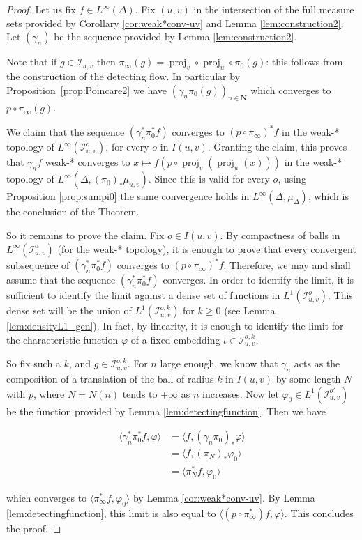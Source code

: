 \documentclass[a4paper, 11pt]{article}
\theoremstyle{plain}
\theoremstyle{definition}
\theoremstyle{remark}
\DeclareMathOperator{\proj}{proj}
\newcommand{\NN}{\mathbf{N}}                          %
\newcommand{\IR}{\mathcal I}
\begin{document}
\begin{proof}
Let us fix $f\in L^\infty(\Delta)$. 
Fix $(u,v)$ in the intersection of the full measure sets provided by Corollary \ref{cor:weak*conv-uv} and Lemma \ref{lem:construction2}. Let $(\gamma_n)$ be the sequence provided by Lemma \ref{lem:construction2}. 

Note that if $g\in \IR_{u,v}$ then $\pi_\infty( g )= \proj_v \circ \proj_u \circ \pi_0 (g)$: this follows from the construction of the detecting flow. In particular by Proposition~\ref{prop:Poincare2} we have $(\gamma_n \pi_0(g))_{n\in \NN}$ which converges to $p\circ \pi_\infty(g)$.

We claim that the sequence $(\gamma_n^* \pi_0^* f)$ converges to $(p\circ \pi_\infty)^* f$ in the weak-* topology of $L^\infty (\IR_{u,v}^o)$, for every $o$ in $I(u,v)$. Granting the claim, this proves that $\gamma_n f$ weak-* converges to $x\mapsto  f(p\circ \proj_v(\proj_u(x)))$ in the weak-* topology of $L^\infty(\Delta,(\pi_0)_* \mu_{u,v})$. Since this is valid for every $o$, using  Proposition \ref{prop:sumpi0}
 the same convergence holds in $L^\infty(\Delta,\mu_{\Delta})$, which is the conclusion of the Theorem.


So it remains to prove the claim. Fix $o\in I(u,v)$. By compactness of balls in $L^\infty(\IR_{u,v}^o)$ (for the weak-* topology), it is enough to prove that every convergent subsequence of $(\gamma_n^* \pi_0^* f)$ converges to $(p\circ \pi_\infty) ^* f$. Therefore, we may and shall assume that the sequence $(\gamma_n^* \pi_0^* f)$ converges. In order to identify the limit, it is sufficient to identify the limit against a dense set of functions in $L^1(\IR_{u,v}^o)$. This dense set will be the union of  $ L^1(\IR_{u,v}^{o,k})$  for $k\geq 0$ (see Lemma \ref{lem:densityL1_gen}).  In fact, by linearity, it is enough to identify the limit for the characteristic function $\varphi$ of a fixed embedding $\iota\in \IR_{u,v}^{o,k}$.

So fix such a $k$, and $g\in \IR_{u,v}^{o,k}$. For $n$ large enough, we know that $\gamma_n$ acts as the composition of a translation of the ball of radius $k$ in $I(u,v)$ by some length $N$  with $p$, where $N=N(n)$ tends to $+\infty$ as $n$ increases. Now let $\varphi_0\in L^1(\IR_{u,v}^{o'})$ be the function provided by Lemma \ref{lem:detectingfunction}. Then we have

\begin{align*}
\langle \gamma_n^* \pi_0^* f,\varphi\rangle  & = \langle f,(\gamma_n  \pi_0)_*\varphi\rangle \\
&=\langle f,(\pi_N)_*\varphi_0\rangle\\
&=\langle \pi_N^*f,\varphi_0\rangle
\end{align*}




which converges to $\langle \pi_\infty^*f,\varphi_0\rangle$ by Lemma \ref{cor:weak*conv-uv}. By Lemma \ref{lem:detectingfunction}, this limit is also equal to $\langle (p\circ \pi_\infty^*)f,\varphi\rangle$. This concludes the proof. 



\end{proof}
\end{document}

